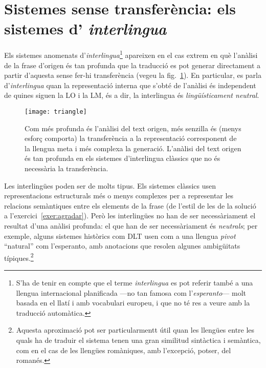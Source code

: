 \section[Sistemes sense transferència: interlingua]{Sistemes sense transferència: els sistemes d'{\em
    interlingua}}
\label{ss:interlingua}

Els sistemes anomenats d'\emph{interlingua}\footnote{S'ha de tenir en
  compte que el terme \emph{interlingua} es pot referir també a una
  llengua internacional planificada ---no tan famosa com
  l'\emph{esperanto}--- molt basada en el llatí i amb vocabulari
  europeu, i que no té res a veure amb la traducció automàtica.}
apareixen en el cas extrem en què l'anàlisi de la frase d'origen és
tan profunda que la traducció es pot generar directament a partir
d'aquesta sense fer-hi transferència (vegeu la
fig.~\ref{fg:triangle}). En particular, es parla d'\emph{interlingua}
quan la representació interna que s'obté de l'anàlisi és independent
de quines siguen la LO i la LM, és a dir, la interlingua és {\em
  lingüísticament neutral}.



\begin{figure}
\begin{center}
\texttt{[image: triangle]}
\end{center}
\caption{Com més profunda és l'anàlisi del text origen,
  més senzilla és (menys esforç comporta) la transferència a la
  representació corresponent de la llengua meta i més complexa la
  generació.  L'anàlisi del text origen és tan profunda en els
  sistemes d'interlingua clàssics que no és necessària la transferència.}
\label{fg:triangle}
\end{figure}

Les interlingües poden ser de molts tipus. Els sistemes clàssics usen
representacions estructurals més o menys complexes per a representar
les relacions semàntiques entre els elements de la frase (de l'estil
de les de la solució a l'exercici~\ref{exer:agradar}). Però les
interlingües no han de ser necessàriament el resultat d'una anàlisi
profunda: el que han de ser necessàriament és \emph{neutrals}; per
exemple, alguns sistemes històrics com DLT \citep[cap.~17]{hutchins92b} usen com
a una llengua \emph{pivot} ``natural'' com l'esperanto, amb anotacions
que resolen algunes ambigüitats típiques.\footnote{Aquesta aproximació
  pot ser particularmentt útil quan les llengües entre les quals ha de
  traduir el sistema tenen una gran similitud sintàctica i semàntica,
  com en el cas de les llengües romàniques, amb l'excepció, potser,
  del romanés.}

